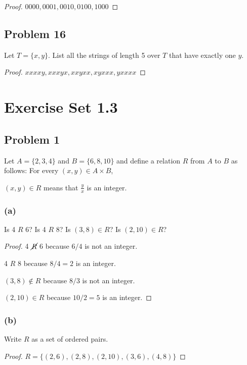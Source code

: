 \documentclass[14pt]{extarticle}
\newcommand{\dps}{\displaystyle}
\begin{document}
\begin{proof}
    $0000, 0001, 0010, 0100, 1000$
\end{proof}

\subsection{Problem 16}
Let $T = \{x, y\}$. List all the strings of length 5 over $T$ that have exactly
one $y$.

\begin{proof}
    $xxxxy, xxxyx, xxyxx, xyxxx, yxxxx$
\end{proof}

\section{Exercise Set 1.3}

\subsection{Problem 1}
Let $A = \{2, 3, 4\}$ and $B = \{6, 8, 10\}$ and define a relation $R$ from
$A$ to $B$ as follows: For every $(x, y) \in A \times B$,

\begin{center}
    $(x, y) \in R$ means that $\dps\frac{y}{x}$ is an integer.
\end{center}

\subsubsection{(a)}
Is 4 $R$ 6? Is 4 $R$ 8? Is $(3, 8) \in R$? Is $(2, 10) \in R$?

\begin{proof}
    4 $\cancel{R}$ 6 because $6 / 4$ is not an integer.

    4 $R$ 8 because $8 / 4 = 2$ is an integer.

    $(3, 8) \notin R$ because $8 / 3$ is not an integer.

    $(2, 10) \in R$ because $10 / 2 = 5$ is an integer.
\end{proof}

\subsubsection{(b)}
Write $R$ as a set of ordered pairs.

\begin{proof}
    $R = \{(2, 6), (2, 8), (2, 10), (3, 6), (4, 8)\}$
\end{proof}
\end{document}
